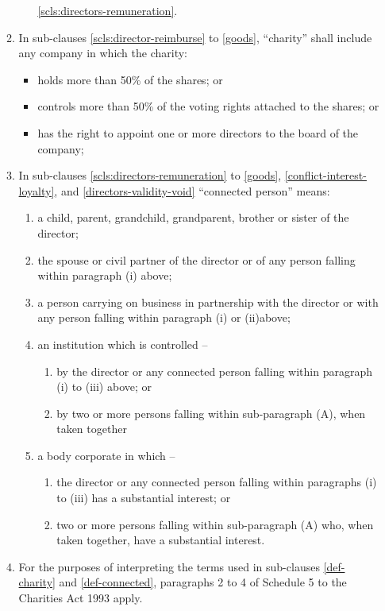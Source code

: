 \begin{enumerate}
\begin{enumerate}
\begin{enumerate}
      \ref{scls:directors-remuneration}.
    \end{enumerate}
  \item \label{def-charity}
    In sub-clauses \ref{scls:director-reimburse} to \ref{goods}, ``charity'' shall include
    any company in which the charity:
    \begin{itemize}
    \item
      holds more than 50\% of the shares; or
    \item
      controls more than 50\% of the voting rights attached to the
      shares; or
    \item
      has the right to appoint one or more directors to the board of the
      company;
    \end{itemize}
  \item \label{def-connected}
    In sub-clauses \ref{scls:directors-remuneration} to \ref{goods}, \ref{conflict-interest-loyalty},
    and \ref{directors-validity-void} ``connected person'' means:
    \begin{enumerate}
    \item
      \label{art:connected-child} a child, parent, grandchild,
      grandparent, brother or sister of the director;
    \item
      \label{art:connected-spouse} the spouse or civil partner of the
      director or of any person falling within paragraph (i) above;
    \item
      \label{art:connected-business} a person carrying on business in
      partnership with the director or with any person falling within
      paragraph (i) or (ii)above;
    \item
      an institution which is controlled –
      \begin{enumerate}
      \item
        by the director or any connected person falling within paragraph (i) to (iii) above; or
      \item
        by two or more persons falling within sub-paragraph (A), when taken
        together
      \end{enumerate}
    \item
      a body corporate in which –
      \begin{enumerate}
        \item
            the director or any connected person falling within paragraphs (i) to (iii) has a substantial interest; or
        \item
            two or more persons falling within sub-paragraph (A) who, when
            taken together, have a substantial interest.
      \end{enumerate}
    \end{enumerate}
  \item
    For the purposes of interpreting the terms used in sub-clauses \ref{def-charity}
    and \ref{def-connected}, paragraphs 2 to 4 of Schedule 5 to the Charities Act 1993
    apply.
  \end{enumerate}


\end{enumerate}
